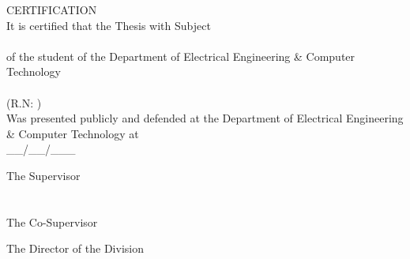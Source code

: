 \pagestyle{empty}
\begin{center}
{\LARGE CERTIFICATION\\[1cm]}
\large It is certified that the Thesis with Subject\\[1cm]
\textbf{\large \doctitle }\\[1cm]
of the student of the Department of Electrical Engineering \& Computer Technology\\[1.5cm]
\me \\[0.5cm]
(R.N: \studnum )\\[1.5cm]
Was presented publicly and defended at the Department of Electrical Engineering \& Computer Technology at\\[1cm]
\Large{\_\_/\_\_/\_\_\_}\\[1.5cm]
\end{center}
\begin{minipage}{0.5\textwidth}
\begin{flushleft} \large
The Supervisor\\[2cm]
\supname \\
\emph{\suptitle}\\[1cm]
The Co-Supervisor\\[2cm]

\end{flushleft}
\end{minipage}
\begin{minipage}{0.5\textwidth}
\begin{flushright} \large
The Director of the Division\\[4cm]
\headofdivision\\
\emph{\headofdivisiontitle}
\end{flushright}
\end{minipage}
